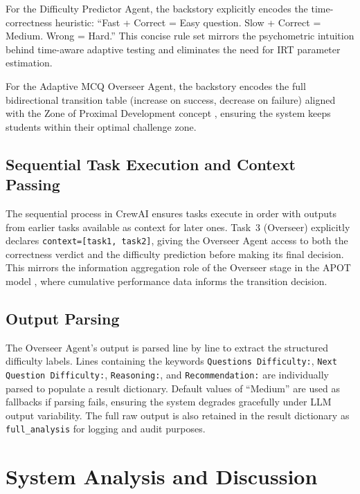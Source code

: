 \documentclass[conference]{IEEEtran}
\begin{document}
For the Difficulty Predictor Agent, the backstory explicitly encodes the time-correctness heuristic: ``Fast + Correct = Easy question. Slow + Correct = Medium. Wrong = Hard.'' This concise rule set mirrors the psychometric intuition behind time-aware adaptive testing \cite{weiss2004} and eliminates the need for IRT parameter estimation.

For the Adaptive MCQ Overseer Agent, the backstory encodes the full bidirectional transition table (increase on success, decrease on failure) aligned with the Zone of Proximal Development concept \cite{vygotsky1978}, ensuring the system keeps students within their optimal challenge zone.

\subsection{Sequential Task Execution and Context Passing}

The sequential process in CrewAI ensures tasks execute in order with outputs from earlier tasks available as context for later ones. Task~3 (Overseer) explicitly declares \texttt{context=[task1, task2]}, giving the Overseer Agent access to both the correctness verdict and the difficulty prediction before making its final decision. This mirrors the information aggregation role of the Overseer stage in the APOT model \cite{outay2024}, where cumulative performance data informs the transition decision.

\subsection{Output Parsing}

The Overseer Agent's output is parsed line by line to extract the structured difficulty labels. Lines containing the keywords \texttt{Questions Difficulty:}, \texttt{Next Question Difficulty:}, \texttt{Reasoning:}, and \texttt{Recommendation:} are individually parsed to populate a result dictionary. Default values of ``Medium'' are used as fallbacks if parsing fails, ensuring the system degrades gracefully under LLM output variability. The full raw output is also retained in the result dictionary as \texttt{full\_analysis} for logging and audit purposes.

\section{System Analysis and Discussion}
\end{document}
